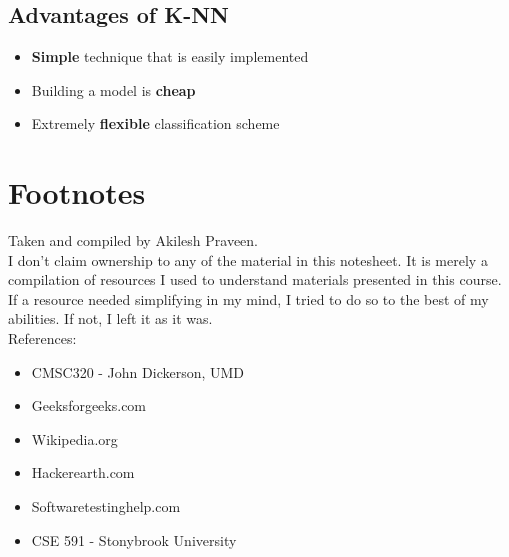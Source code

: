 \documentclass[english, 10pt]{article}
\begin{document}
\subsection{Advantages of K-NN}

\begin{itemize}
	\item \textbf{Simple} technique that is easily implemented
	\item Building a model is \textbf{cheap}
	\item Extremely \textbf{flexible} classification scheme
\end{itemize}












\section{Footnotes}

Taken and compiled by Akilesh Praveen.\\

I don't claim ownership to any of the material in this notesheet. It is merely a compilation of resources I used to understand materials presented in this course. If a resource needed simplifying in my mind, I tried to do so to the best of my abilities. If not, I left it as it was.\\

References:
\begin{itemize}
	\item CMSC320 - John Dickerson, UMD
	\item Geeksforgeeks.com
	\item Wikipedia.org
	\item Hackerearth.com
	\item Softwaretestinghelp.com
	\item CSE 591 - Stonybrook University
\end{itemize}
\end{document}
